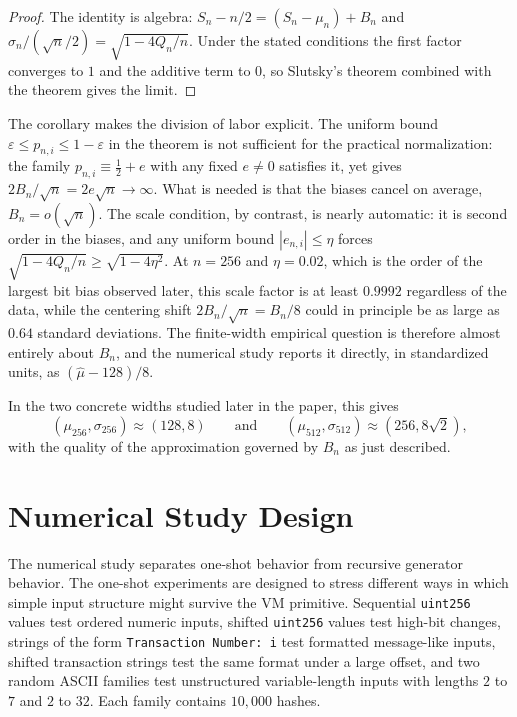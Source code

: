 \documentclass[11pt]{article}
\begin{document}
\begin{proof}
The identity is algebra: $S_n - n/2 = (S_n-\mu_n) + B_n$ and
$\sigma_n/(\sqrt{n}/2) = \sqrt{1-4Q_n/n}$. Under the stated conditions the
first factor converges to $1$ and the additive term to $0$, so Slutsky's
theorem combined with the theorem gives the limit.
\end{proof}

The corollary makes the division of labor explicit. The uniform bound
$\varepsilon\le p_{n,i}\le 1-\varepsilon$ in the theorem is not sufficient for
the practical normalization: the family $p_{n,i}\equiv \tfrac12 + e$ with any
fixed $e\neq 0$ satisfies it, yet gives $2B_n/\sqrt{n} = 2e\sqrt{n}\to\infty$.
What is needed is that the biases cancel on average, $B_n = o(\sqrt{n})$. The
scale condition, by contrast, is nearly automatic: it is second order in the
biases, and any uniform bound $|e_{n,i}|\le \eta$ forces
$\sqrt{1-4Q_n/n}\ge\sqrt{1-4\eta^2}$. At $n=256$ and $\eta = 0.02$, which is
the order of the largest bit bias observed later, this scale factor is at least
$0.9992$ regardless of the data, while the centering shift $2B_n/\sqrt{n} =
B_n/8$ could in principle be as large as $0.64$ standard deviations. The
finite-width empirical question is therefore almost entirely about $B_n$,
and the numerical study reports it directly, in standardized units, as
$(\hat\mu-128)/8$.

In the two concrete widths studied later in the paper, this gives
\[
(\mu_{256}, \sigma_{256}) \approx (128, 8)
\qquad \text{and} \qquad
(\mu_{512}, \sigma_{512}) \approx (256, 8\sqrt{2}),
\]
with the quality of the approximation governed by $B_n$ as just described.

\section{Numerical Study Design}

The numerical study separates one-shot behavior from recursive generator
behavior. The one-shot experiments are designed to stress different ways in
which simple input structure might survive the VM primitive. Sequential
\texttt{uint256} values test ordered numeric inputs, shifted
\texttt{uint256} values test high-bit changes, strings of the form
\texttt{Transaction Number: i} test formatted message-like inputs, shifted
transaction strings test the same format under a large offset, and two random
ASCII families test unstructured variable-length inputs with lengths $2$ to
$7$ and $2$ to $32$. Each family contains $10{,}000$ hashes.
\end{document}
